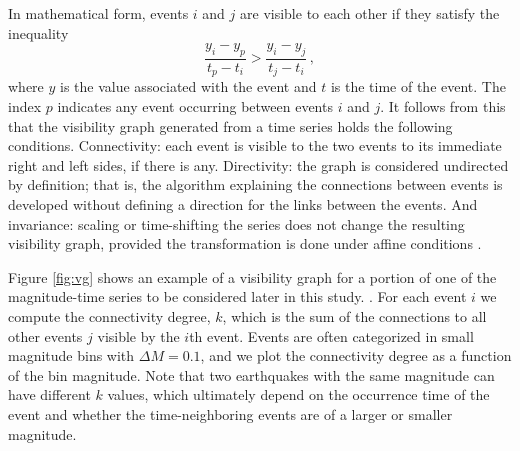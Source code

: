 In mathematical form, events $i$ and $j$ are visible to each other if they satisfy the inequality
%
\begin{equation}
	\frac{y_i - y_p }{t_p - t_i} > \frac{y_i - y_j}{ t_j - t_i} \, ,
	\label{eq:vg}
\end{equation}
%
\noindent
where $y$ is the value associated with the event and $t$ is the time of the event. The index $p$ indicates any event occurring between events $i$  and $j$. It follows from this that the visibility graph generated from a time series holds the following conditions. Connectivity: each event is visible to the two events to its immediate right and left sides, if there is any. Directivity: the graph is considered undirected by definition; that is, the algorithm explaining the connections between events is developed without defining a direction for the links between the events. And invariance: scaling or time-shifting the series does not change the resulting visibility graph, provided the transformation is done under affine conditions \citep{Lacasa2008}.

Figure \ref{fig:vg} shows an example of a visibility graph for a portion of one of the magnitude-time series to be considered later in this study. . For each event $i$ we compute the connectivity degree, $k$, which is the sum of the connections to all other events $j$ visible by the $i$th event. Events are often categorized in small magnitude bins with $\Delta M = 0.1$, and we plot the connectivity degree as a function of the bin magnitude. Note that two earthquakes with the same magnitude can have different $k$ values, which ultimately depend on the occurrence time of the event and whether the time-neighboring events are of a larger or smaller magnitude.

